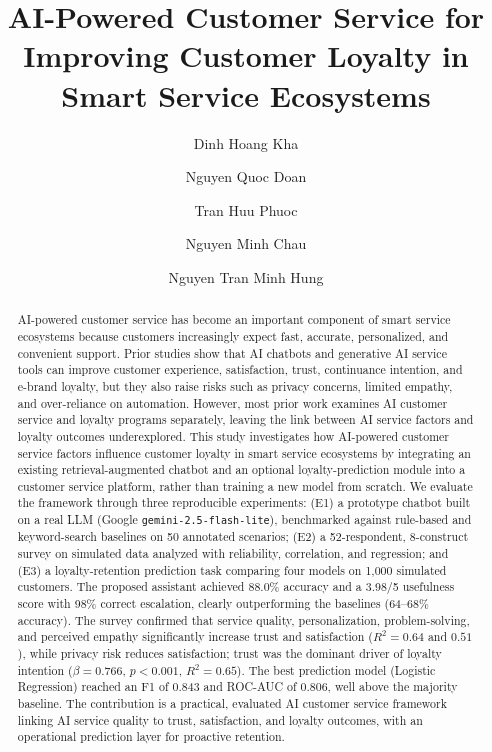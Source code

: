 \documentclass[runningheads]{llncs}
\begin{document}
%
\title{AI-Powered Customer Service for Improving Customer Loyalty in Smart Service Ecosystems}
%
\author{Dinh Hoang Kha \and
Nguyen Quoc Doan \and
Tran Huu Phuoc \and
Nguyen Minh Chau \and
Nguyen Tran Minh Hung}
%
%
%
\maketitle
%
\begin{abstract}
AI-powered customer service has become an important component of smart service ecosystems because customers increasingly expect fast, accurate, personalized, and convenient support. Prior studies show that AI chatbots and generative AI service tools can improve customer experience, satisfaction, trust, continuance intention, and e-brand loyalty, but they also raise risks such as privacy concerns, limited empathy, and over-reliance on automation. However, most prior work examines AI customer service and loyalty programs separately, leaving the link between AI service factors and loyalty outcomes underexplored. This study investigates how AI-powered customer service factors influence customer loyalty in smart service ecosystems by integrating an existing retrieval-augmented chatbot and an optional loyalty-prediction module into a customer service platform, rather than training a new model from scratch. We evaluate the framework through three reproducible experiments: (E1) a prototype chatbot built on a real LLM (Google \texttt{gemini-2.5-flash-lite}), benchmarked against rule-based and keyword-search baselines on 50 annotated scenarios; (E2) a 52-respondent, 8-construct survey on simulated data analyzed with reliability, correlation, and regression; and (E3) a loyalty-retention prediction task comparing four models on 1{,}000 simulated customers. The proposed assistant achieved 88.0\% accuracy and a 3.98/5 usefulness score with 98\% correct escalation, clearly outperforming the baselines (64--68\% accuracy). The survey confirmed that service quality, personalization, problem-solving, and perceived empathy significantly increase trust and satisfaction ($R^2 = 0.64$ and $0.51$), while privacy risk reduces satisfaction; trust was the dominant driver of loyalty intention ($\beta = 0.766$, $p < 0.001$, $R^2 = 0.65$). The best prediction model (Logistic Regression) reached an F1 of 0.843 and ROC-AUC of 0.806, well above the majority baseline. The contribution is a practical, evaluated AI customer service framework linking AI service quality to trust, satisfaction, and loyalty outcomes, with an operational prediction layer for proactive retention.

\end{abstract}
%
\end{document}
